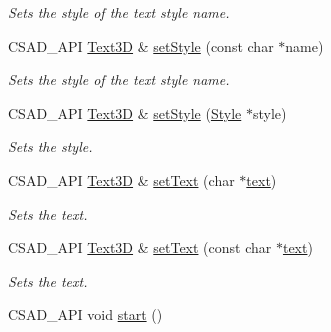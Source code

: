 \begin{DoxyCompactItemize}
\begin{DoxyCompactList}\small\item\em Sets the style of the text style name. \end{DoxyCompactList}\item 
\hypertarget{classcsad_1_1_text3_d_a3b751cd3479ef65127f0b2fe6eb1c81d}{C\-S\-A\-D\-\_\-\-A\-P\-I \hyperlink{classcsad_1_1_text3_d}{Text3\-D} \& \hyperlink{classcsad_1_1_text3_d_a3b751cd3479ef65127f0b2fe6eb1c81d}{set\-Style} (const char $\ast$name)}\label{classcsad_1_1_text3_d_a3b751cd3479ef65127f0b2fe6eb1c81d}

\begin{DoxyCompactList}\small\item\em Sets the style of the text style name. \end{DoxyCompactList}\item 
\hypertarget{classcsad_1_1_text3_d_aef1fbc8c246d1ccb519a8538f680c3b8}{C\-S\-A\-D\-\_\-\-A\-P\-I \hyperlink{classcsad_1_1_text3_d}{Text3\-D} \& \hyperlink{classcsad_1_1_text3_d_aef1fbc8c246d1ccb519a8538f680c3b8}{set\-Style} (\hyperlink{classcsad_1_1_style}{Style} $\ast$style)}\label{classcsad_1_1_text3_d_aef1fbc8c246d1ccb519a8538f680c3b8}

\begin{DoxyCompactList}\small\item\em Sets the style. \end{DoxyCompactList}\item 
\hypertarget{classcsad_1_1_text3_d_aa582e107e181674db00fabad2cc80457}{C\-S\-A\-D\-\_\-\-A\-P\-I \hyperlink{classcsad_1_1_text3_d}{Text3\-D} \& \hyperlink{classcsad_1_1_text3_d_aa582e107e181674db00fabad2cc80457}{set\-Text} (char $\ast$\hyperlink{classcsad_1_1_text3_d_a189ccec8b8310503a73c5ce304e0e557}{text})}\label{classcsad_1_1_text3_d_aa582e107e181674db00fabad2cc80457}

\begin{DoxyCompactList}\small\item\em Sets the text. \end{DoxyCompactList}\item 
\hypertarget{classcsad_1_1_text3_d_ab22949e1eefb67db5234696e9c68af2c}{C\-S\-A\-D\-\_\-\-A\-P\-I \hyperlink{classcsad_1_1_text3_d}{Text3\-D} \& \hyperlink{classcsad_1_1_text3_d_ab22949e1eefb67db5234696e9c68af2c}{set\-Text} (const char $\ast$\hyperlink{classcsad_1_1_text3_d_a189ccec8b8310503a73c5ce304e0e557}{text})}\label{classcsad_1_1_text3_d_ab22949e1eefb67db5234696e9c68af2c}

\begin{DoxyCompactList}\small\item\em Sets the text. \end{DoxyCompactList}\item 
\hypertarget{classcsad_1_1_text3_d_a65b09648882d85a87b83c2d2192374d0}{C\-S\-A\-D\-\_\-\-A\-P\-I void \hyperlink{classcsad_1_1_text3_d_a65b09648882d85a87b83c2d2192374d0}{start} ()}\label{classcsad_1_1_text3_d_a65b09648882d85a87b83c2d2192374d0}


\end{DoxyCompactItemize}
